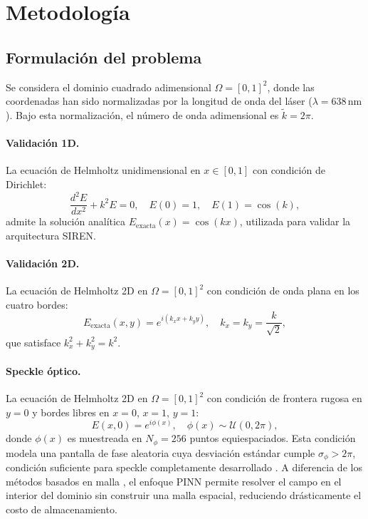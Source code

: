 
\section{Metodología}
\label{sec:metodologia}

\subsection{Formulación del problema}
\label{subsec:formulacion}

Se considera el dominio cuadrado adimensional $\Omega = [0,1]^2$, donde las coordenadas
han sido normalizadas por la longitud de onda del láser ($\lambda = 638\,\mathrm{nm}$).
Bajo esta normalización, el número de onda adimensional es $\tilde{k} = 2\pi$.

\paragraph{Validación 1D.}
La ecuación de Helmholtz unidimensional en $x \in [0,1]$ con condición de Dirichlet:
%
\begin{equation}
  \frac{d^2 E}{dx^2} + k^2 E = 0, \quad E(0) = 1, \quad E(1) = \cos(k),
  \label{eq:helmholtz1d}
\end{equation}
%
admite la solución analítica $E_{\mathrm{exacta}}(x) = \cos(kx)$, utilizada para
validar la arquitectura SIREN.

\paragraph{Validación 2D.}
La ecuación de Helmholtz 2D en $\Omega = [0,1]^2$ con condición de onda plana en los
cuatro bordes:
%
\begin{equation}
  E_{\mathrm{exacta}}(x,y) = e^{i(k_x x + k_y y)}, \quad k_x = k_y = \frac{k}{\sqrt{2}},
  \label{eq:solucion2d}
\end{equation}
%
que satisface $k_x^2 + k_y^2 = k^2$.

\paragraph{Speckle óptico.}
La ecuación de Helmholtz 2D en $\Omega = [0,1]^2$ con condición de frontera rugosa
en $y = 0$ y bordes libres en $x = 0$, $x = 1$, $y = 1$:
%
\begin{equation}
  E(x, 0) = e^{i\phi(x)}, \quad \phi(x) \sim \mathcal{U}(0, 2\pi),
  \label{eq:frontera_rugosa}
\end{equation}
%
donde $\phi(x)$ es muestreada en $N_\phi = 256$ puntos equiespaciados.
Esta condición modela una pantalla de fase aleatoria cuya desviación estándar cumple
$\sigma_\phi > 2\pi$, condición suficiente para speckle completamente desarrollado
\citep{Goodman2007_Speckle, Fang2020_scattering}.
A diferencia de los métodos basados en malla \citep{Jin2014_FEM}, el enfoque PINN permite
resolver el campo en el interior del dominio sin construir una malla espacial,
reduciendo drásticamente el costo de almacenamiento.

